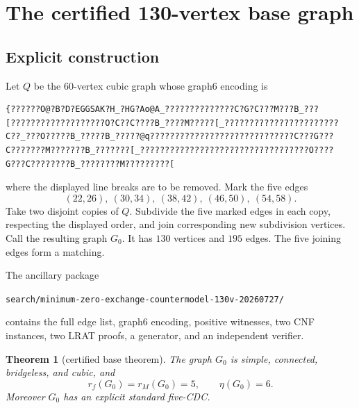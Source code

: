 \documentclass[11pt]{article}
\newtheorem{theorem}{Theorem}[section]
\theoremstyle{definition}
\newcommand{\etaext}{\eta}
\begin{document}
\section{The certified 130-vertex base graph}
\label{sec:base}

\subsection{Explicit construction}

Let \(Q\) be the \(60\)-vertex cubic graph whose graph6 encoding is
\begin{verbatim}
{??????O@?B?D?EGGSAK?H_?HG?Ao@A_??????????????C?G?C???M???B_???
[???????????????????O?C??C????B_????M?????[_???????????????????????
C??_???O?????B_?????B_?????@q?????????????????????????????C???G???
C???????M???????B_???????[_??????????????????????????????????O????
G???C????????B_????????M?????????[
\end{verbatim}
where the displayed line breaks are to be removed.  Mark the five edges
\[
 (22,26),\ (30,34),\ (38,42),\ (46,50),\ (54,58).
\]
Take two disjoint copies of \(Q\).  Subdivide the five marked edges in
each copy, respecting the displayed order, and join corresponding new
subdivision vertices.  Call the resulting graph \(G_0\).  It has
\(130\) vertices and \(195\) edges.  The five joining edges form a
matching.

The ancillary package
\begin{center}
\texttt{search/minimum-zero-exchange-countermodel-130v-20260727/}
\end{center}
contains the full edge list, graph6 encoding, positive witnesses, two CNF
instances, two LRAT proofs, a generator, and an independent verifier.

\begin{theorem}[certified base theorem]
\label{thm:base}
The graph \(G_0\) is simple, connected, bridgeless, and cubic, and
\[
 r_f(G_0)=r_M(G_0)=5,\qquad \etaext(G_0)=6.
\]
Moreover \(G_0\) has an explicit standard five-CDC.
\end{theorem}
\end{document}

